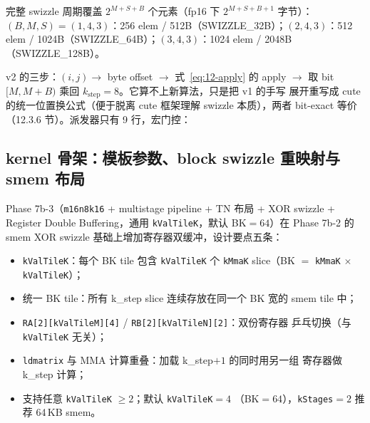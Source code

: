 完整 swizzle 周期覆盖 $2^{M+S+B}$ 个元素（fp16 下 $2^{M+S+B+1}$ 字节）：
$(B,M,S)=(1,4,3)$：256 elem / 512B（SWIZZLE\_32B）；$(2,4,3)$：512 elem /
1024B（SWIZZLE\_64B）；$(3,4,3)$：1024 elem / 2048B（SWIZZLE\_128B）。





v2 的三步：$(i,j)\to$ byte offset $\to$ 式~\ref{eq:12-apply} 的 apply $\to$ 取
bit $[M,M{+}B)$ 乘回 $k_{\mathrm{step}}{=}8$。它算不上新算法，只是把 v1 的手写
展开重写成 cute 的统一位置换公式（便于脱离 cute 框架理解 swizzle 本质），两者
bit-exact 等价（12.3.6 节）。派发器只有 9 行，宏门控：



\subsection{kernel 骨架：模板参数、block swizzle 重映射与 smem 布局}

Phase 7b-3（\texttt{m16n8k16} + multistage pipeline + TN 布局 + XOR swizzle +
Register Double Buffering，通用 \texttt{kValTileK}，默认 BK$=64$）在 Phase 7b-2
的 smem XOR swizzle 基础上增加寄存器双缓冲，设计要点五条：

\begin{itemize}
  \item \texttt{kValTileK}：每个 BK tile 包含 \texttt{kValTileK} 个 \texttt{kMmaK}
        slice（BK $=$ \texttt{kMmaK} $\times$ \texttt{kValTileK}）；
  \item 统一 BK tile：所有 k\_step slice 连续存放在同一个 BK 宽的 smem tile 中；
  \item \texttt{RA[2][kValTileM][4]} / \texttt{RB[2][kValTileN][2]}：双份寄存器
        乒乓切换（与 \texttt{kValTileK} 无关）；
  \item \texttt{ldmatrix} 与 MMA 计算重叠：加载 k\_step$+1$ 的同时用另一组
        寄存器做 k\_step 计算；
  \item 支持任意 \texttt{kValTileK} $\ge 2$；默认 \texttt{kValTileK}$=4$
        （BK$=64$），\texttt{kStages}$=2$ 推荐 64\,KB smem。
\end{itemize}

